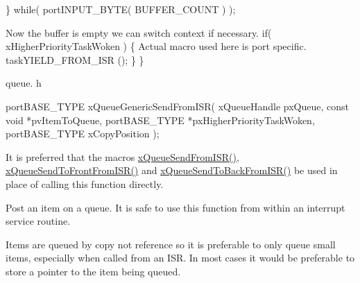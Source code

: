 \begin{DoxyPre}    \} while( portINPUT\_BYTE( BUFFER\_COUNT ) );\end{DoxyPre}



\begin{DoxyPre}Now the buffer is empty we can switch context if necessary.
    if( xHigherPriorityTaskWoken )
    \{
Actual macro used here is port specific.
        taskYIELD\_FROM\_ISR ();
    \}
 \}
 \end{DoxyPre}


queue. h 
\begin{DoxyPre}
 portBASE\_TYPE xQueueGenericSendFromISR(
                                           xQueueHandle pxQueue,
                                           const    void    *pvItemToQueue,
                                           portBASE\_TYPE    *pxHigherPriorityTaskWoken,
                                           portBASE\_TYPE    xCopyPosition
                                       );
 \end{DoxyPre}


It is preferred that the macros \hyperlink{queue_8h_a2e8236e9af01eedcbc8b67a9cb56b1db}{x\-Queue\-Send\-From\-I\-S\-R()}, \hyperlink{queue_8h_a849dd669e72bfb12314f4445157c9a04}{x\-Queue\-Send\-To\-Front\-From\-I\-S\-R()} and \hyperlink{queue_8h_a5a4b46fc55ab9f63b89878b37352f521}{x\-Queue\-Send\-To\-Back\-From\-I\-S\-R()} be used in place of calling this function directly.

Post an item on a queue. It is safe to use this function from within an interrupt service routine.

Items are queued by copy not reference so it is preferable to only queue small items, especially when called from an I\-S\-R. In most cases it would be preferable to store a pointer to the item being queued.


